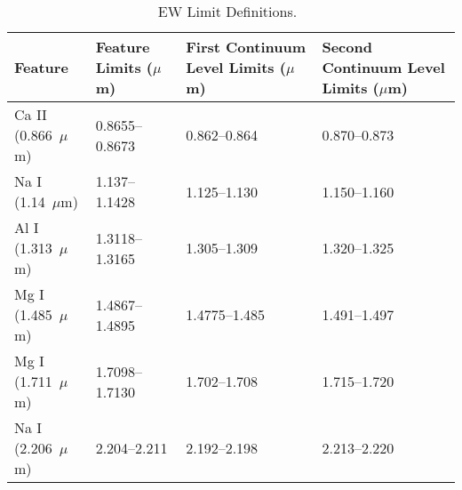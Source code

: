 \begin{table}[H]
    \caption{EW Limit Definitions.~\label{tab:features}}
	\begin{tabular}{l|l|l|l}
		Feature & Feature Limits ($\mu$m) & First Continuum Level Limits ($\mu$m) & Second Continuum Level Limits ($\mu$m) \\ \hline
		Ca II (0.866~$\mu$m) & 0.8655--0.8673 & 0.862--0.864 & 0.870--0.873 \\
		Na I (1.14~$\mu$m) & 1.137--1.1428 & 1.125--1.130 & 1.150--1.160 \\
		Al I (1.313~$\mu$m) & 1.3118--1.3165 & 1.305--1.309 & 1.320--1.325 \\
		Mg I (1.485~$\mu$m) & 1.4867--1.4895 & 1.4775--1.485 & 1.491--1.497 \\
		Mg I (1.711~$\mu$m) & 1.7098--1.7130 & 1.702--1.708 & 1.715--1.720 \\
		Na I (2.206~$\mu$m) & 2.204--2.211 & 2.192--2.198 & 2.213--2.220 \\
	\end{tabular}
\end{table}